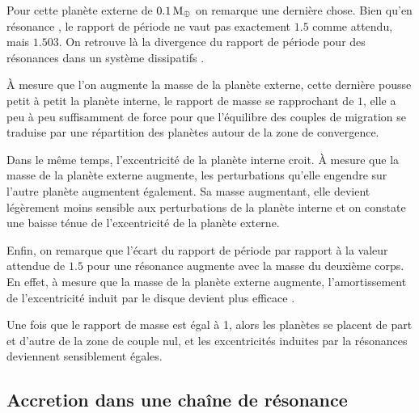 Pour cette planète externe de $0.1\mathrm{\thinspace M_\oplus}$ on remarque une dernière chose. Bien qu'en résonance , le rapport de période
ne vaut pas exactement $1.5$ comme attendu, mais $1.503$. On retrouve là la divergence du rapport de période pour des
résonances dans un système dissipatifs \citep{batygin2013dissipative}. 

\bigskip

À mesure que l'on augmente la masse de la planète externe, cette dernière pousse petit à petit la planète interne, le rapport
de masse se rapprochant de $1$, elle a peu à peu suffisamment de force pour que l'équilibre des couples de migration se
traduise par une répartition des planètes autour de la zone de convergence. 

Dans le même temps, l'excentricité de la planète interne croit. À mesure que la masse de la planète externe augmente, les
perturbations qu'elle engendre sur l'autre planète augmentent également. Sa masse augmentant, elle devient légèrement moins
sensible aux perturbations de la planète interne et on constate une baisse ténue de l'excentricité de la planète externe. 

Enfin, on remarque que l'écart du rapport de période par rapport à la valeur attendue de $1.5$ pour une résonance 
augmente avec la masse du deuxième corps. En effet, à mesure que la masse de la planète externe augmente, l'amortissement de
l'excentricité induit par le disque devient plus efficace \citep[eq. (9)]{cresswell2008three}. 

\bigskip

Une fois que le rapport de masse est égal à 1, alors les planètes se placent de part et d'autre de la zone de couple nul, et
les excentricités induites par la résonances deviennent sensiblement égales.

\subsection{Accretion dans une chaîne de résonance}

